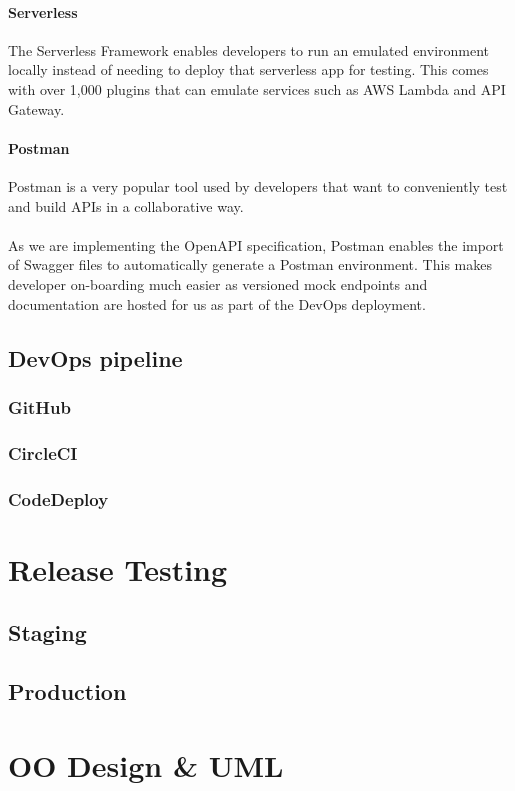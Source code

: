 \documentclass[10pt]{article}
\begin{document}
\paragraph{Serverless}
The Serverless Framework enables developers to run an emulated environment locally instead of needing to deploy that serverless app for testing. This comes with over 1,000 plugins that can emulate services such as AWS Lambda and API Gateway. 
\paragraph{Postman}

Postman is a very popular tool used by developers that want to conveniently test and build APIs in a collaborative way.
\\ \\
As we are implementing the OpenAPI specification, Postman enables the import of Swagger files to automatically generate a Postman environment. This makes developer on-boarding much easier as versioned mock endpoints and documentation are hosted for us as part of the DevOps deployment.


\subsection{DevOps pipeline}
\subsubsection{GitHub}
\subsubsection{CircleCI}
\subsubsection{CodeDeploy}

\section{Release Testing}
\subsection{Staging}
\subsection{Production}

\newpage
\section{OO Design \& UML}
\newpage

\printbibliography
\end{document}

